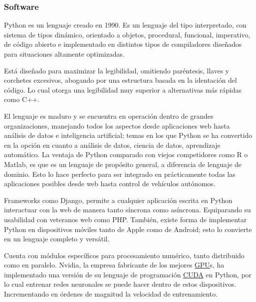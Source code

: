 

\subsubsection{Software}

Python es un lenguaje creado en 1990. Es un lenguaje del tipo interpretado, con
sistema de tipos dinámico, orientado a objetos, procedural, funcional,
imperativo, de código abierto e implementado en distintos tipos de compiladores
diseñados para situaciones altamente optimizadas.

Está diseñado para maximizar la legibilidad, omitiendo paréntesis, llaves y
corchetes excesivos, abogando por una estructura basada en la identación del
código. Lo cual otorga una legibilidad muy superior a alternativas más rápidas
como C++. 

El lenguaje es maduro y se encuentra en operación dentro de grandes
organizaciones, manejando todos los aspectos desde aplicaciones web hasta
análisis de datos e inteligencia artificial; temas en los que Python se ha
convertido en la opción en cuanto a análisis de datos, ciencia de datos,
aprendizaje automático. La ventaja de Python comparado con viejos competidores
como R o Matlab, es que es un lenguaje de propósito general, a diferencia de
lenguaje de dominio. Esto lo hace perfecto para ser integrado en prácticamente
todas las aplicaciones posibles desde web hasta control de vehículos autónomos. 

Frameworks como Django, permite a cualquier aplicación escrita en Python
interactuar con la web de manera tanto síncrona como asíncrona. Equiparando su
usabilidad con veteranos web como PHP. También, existe forma de implementar
Python en dispositivos móviles tanto de Apple como de Android; esto lo convierte
en un lenguaje completo y versátil.

Cuenta con módulos específicos para procesamiento numérico, tanto distribuido
como en paralelo. Nvidia, la empresa fabricante de los mejores
\hyperlink{abbr}{GPU}s, ha implementado una versión de su lenguaje de
programación \hyperlink{abbr}{CUDA} en Python, por lo cual entrenar redes
neuronales se puede hacer dentro de estos dispositivos. Incrementando en órdenes
de magnitud la velocidad de entrenamiento.

